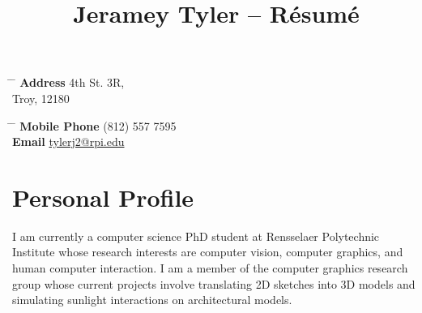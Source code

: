\documentclass[10pt]{article} %
\begin{document}

\title{Jeramey Tyler -- Résumé} %


\parbox{0.5\textwidth}{ %
\begin{tabbing} %
\hspace{3cm} \= \hspace{4cm} \= \kill %
{\bf Address}  4th St. 3R,\\ %
\> Troy, 12180\\ %
\end{tabbing}}
\hfill %
\parbox{0.5\textwidth}{ %
\begin{tabbing} %
\hspace{3cm} \= \hspace{4cm} \= \kill %
{\bf Mobile Phone} \> (812) 557 7595\\ %
{\bf Email} \> \href{mailto:tylerj2@rpi.edu}{tylerj2@rpi.edu} \\ %
\end{tabbing}}


\section{Personal Profile}

I am currently a computer science PhD student at Rensselaer Polytechnic Institute whose research interests are computer vision, computer graphics, and human computer interaction. I am a member of the computer graphics research group whose current projects involve translating 2D sketches into 3D models and simulating sunlight interactions on architectural models.

\end{document}
